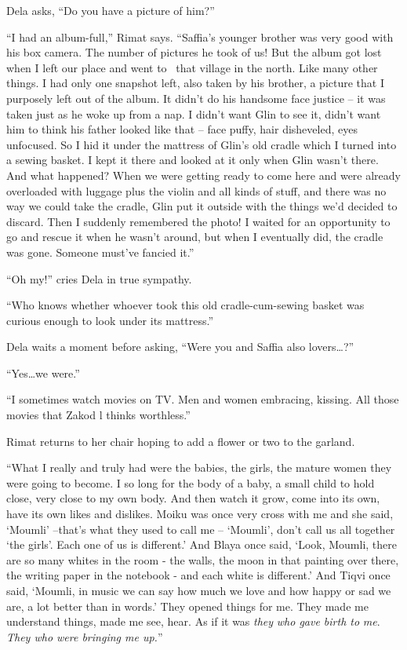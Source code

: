 \documentclass[twoside,11pt]{book}
\begin{document}
Dela asks, ``Do you have a picture of him?''

``I had an album-full,'' Rimat says. ``Saffia's younger brother was very good
with his box camera. The number of pictures he took of us! But the album got lost when I left our place and went to
\ that village in the north. Like many other things. I had only one snapshot left, also taken by his brother, a picture
that I purposely left out of the album. It didn't do his handsome face justice -- it was taken just as he woke up from
a nap. I didn't want Glin to see it, didn't want him to think his father looked like that -- face puffy, hair
disheveled, eyes unfocused. So I hid it under the mattress of Glin's old cradle which I turned into a sewing basket. I
kept it there and looked at it only when Glin wasn't there. And what happened? When we were getting ready to come here
and were already overloaded with luggage plus the violin and all kinds of stuff, and there was no way we could take the
cradle, Glin put it outside with the things we'd decided to discard. Then I suddenly remembered the photo! I waited for
an opportunity to go and rescue it when he wasn't around, but when I eventually did, the cradle was gone. Someone
must've fancied it.''

``Oh my!'' cries Dela in true sympathy.

``Who knows whether whoever took this old cradle-cum-sewing basket was curious enough to look under its
mattress.''

Dela waits a moment before asking, ``Were you and Saffia also lovers{\ldots}?''

``Yes{\dots}we were.''

``I sometimes watch movies on TV. Men and women embracing, kissing. All those movies that Zakod l thinks
worthless.''

Rimat returns to her chair hoping to add a flower or two to the garland.

``What I really and truly had were the babies, the girls, the mature women they were going to become. I so
long for the body of a baby, a small child to hold close, very close to my own body. And then watch it grow, come into
its own, have its own likes and dislikes. Moiku was once very cross with me and she said, `Moumli' --that's what they
used to call me -- `Moumli', don't call us all together `the girls'. Each one of us is different.' And Blaya once
said, `Look, Moumli, there are so many whites in the room - the walls, the moon in that painting over there, the
writing paper in the notebook - and each white is different.' And Tiqvi once said, `Moumli, in music we can say how
much we love and how happy or sad we are, a lot better than in words.' They opened things for me. They made me
understand things, made me see, hear. As if it was \textit{they} \textit{who gave birth to} \textit{me}. \textit{They
who were bringing me up.}''
\end{document}
